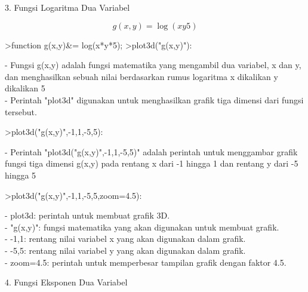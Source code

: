 \documentclass[a4paper,10pt]{article}
\begin{document}
\begin{eulernotebook}
\begin{eulercomment}
\begin{eulercomment}
\begin{eulercomment}
\begin{eulercomment}
\begin{eulercomment}
\begin{eulercomment}
\begin{eulercomment}
\begin{eulercomment}
\begin{eulercomment}
\end{eulercomment}
\eulersubheading{}
\begin{eulercomment}
3. Fungsi Logaritma Dua Variabel

\end{eulercomment}
\begin{eulerformula}
\[
g(x,y) = \log(xy5)
\]
\end{eulerformula}
\begin{eulerprompt}
>function g(x,y)&= log(x*y*5);
>plot3d("g(x,y)"):
\end{eulerprompt}
\begin{eulercomment}
- Fungsi g(x,y) adalah fungsi matematika yang mengambil dua variabel,
x dan y, dan menghasilkan sebuah nilai berdasarkan rumus logaritma x
dikalikan y dikalikan 5\\
- Perintah "plot3d" digunakan untuk menghasilkan grafik tiga dimensi
dari fungsi tersebut.
\end{eulercomment}
\begin{eulerprompt}
>plot3d("g(x,y)",-1,1,-5,5):
\end{eulerprompt}
\begin{eulercomment}
- Perintah "plot3d("g(x,y)",-1,1,-5,5)" adalah perintah untuk
menggambar grafik fungsi tiga dimensi g(x,y) pada rentang x dari -1
hingga 1 dan rentang y dari -5 hingga 5
\end{eulercomment}
\begin{eulerprompt}
>plot3d("g(x,y)",-1,1,-5,5,zoom=4.5):
\end{eulerprompt}
\begin{eulercomment}
- plot3d: perintah untuk membuat grafik 3D.\\
- "g(x,y)": fungsi matematika yang akan digunakan untuk membuat
grafik.\\
- -1,1: rentang nilai variabel x yang akan digunakan dalam grafik.\\
- -5,5: rentang nilai variabel y yang akan digunakan dalam grafik.\\
- zoom=4.5: perintah untuk memperbesar tampilan grafik dengan faktor
4.5.

\end{eulercomment}
\eulersubheading{}
\begin{eulercomment}
4. Fungsi Eksponen Dua Variabel


\end{eulercomment}
\end{eulercomment}
\end{eulercomment}
\end{eulercomment}
\end{eulercomment}
\end{eulercomment}
\end{eulercomment}
\end{eulercomment}
\end{eulercomment}
\end{eulernotebook}
\end{document}
